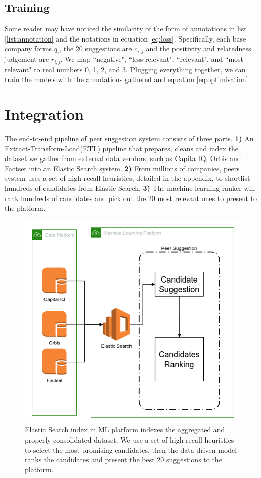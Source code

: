 \documentclass[]{article}
\begin{document}
\subsection{Training}

Some reader may have noticed the similarity of the form of annotations in list 
\ref{list:annotation} and the notations in equation \ref{eq:loss}. 
Specifically, each base company forms $q_i$, the 20 suggestions are $c_{i, j}$ 
and the positivity and relatedness judgement are $r_{i, j}$. We map 
``negative", ``less relevant", ``relevant", and ``most relevant" to real 
numbers 0, 1, 2, and 3. Plugging everything together, we can train the models 
with the annotations gathered and equation \ref{eq:optimisation}.

\section{Integration}
The end-to-end pipeline of peer suggestion system consists of three 
parts. \textbf{1)} An Extract-Transform-Load(ETL) pipeline that prepares, 
cleans and index the dataset we gather from external data vendors, such as 
Capita IQ, Orbis and Factset into an Elastic Search system. \textbf{2)} From 
millions of companies, peers system uses a set of high-recall heuristics, 
detailed in the appendix, to 
shortlist hundreds of candidates from Elastic Search. \textbf{3)} The machine 
learning ranker will 
rank hundreds of candidates and pick out the 20 most relevant ones to present 
to the platform. 

\begin{figure}[h]
    \centering
    \includegraphics[width=.95\linewidth]{./fig/peers.png}
    \caption{Elastic Search index in ML platform indexes the aggregated and 
    properly consolidated dataset. We use a set of high recall heuristics to 
    select the most promising candidates, then the data-driven model ranks the 
    candidates and present the best 20 suggestions to the 
    platform.\label{fig:peers_integration}}
\end{figure}
\end{document}
